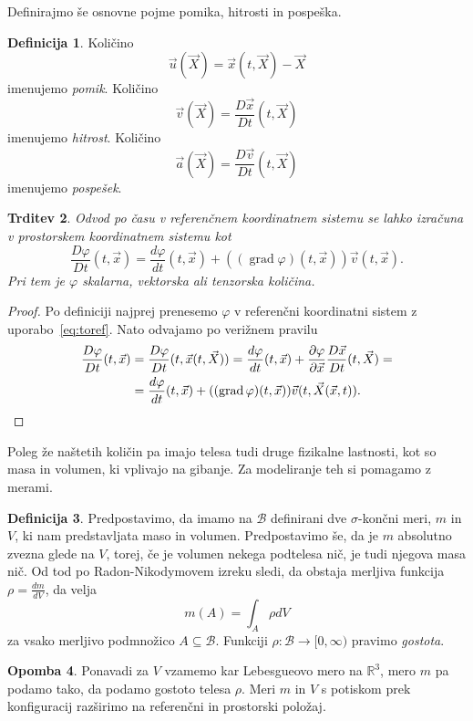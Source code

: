 \documentclass[12pt,a4paper,twoside]{article}
\theoremstyle{definition} %
\newtheorem{definicija}{Definicija}[section]
\newtheorem{opomba}[definicija]{Opomba}
\theoremstyle{plain} %
\newtheorem{trditev}[definicija]{Trditev}
\numberwithin{equation}{section}
\newcommand{\R}{\mathbb R}
\newcommand{\B}{\mathcal{B}}
\newcommand{\grad}{\operatorname{grad}}
\renewcommand{\phi}{\varphi}
\newcommand{\dpar}[2]{\ensuremath{\frac{\partial #1}{\partial #2}}}
\newcommand{\dd}[2]{\ensuremath{\frac{d #1}{d #2}}}
\newcommand{\ddt}[1]{\dd{#1}{t}}
\newcommand{\DD}[2]{\ensuremath{\frac{D #1}{D #2}}}
\newcommand{\DDt}[1]{\DD{#1}{t}}
\newcommand{\vv}{\vec{v}}
\newcommand{\vu}{\vec{u}}
\newcommand{\va}{\vec{a}}
\newcommand{\vX}{\vec{X}}
\newcommand{\vx}{\vec{x}}
\begin{document}
Definirajmo še osnovne pojme pomika, hitrosti in pospeška.
\begin{definicija}
  Količino \begin{equation} \vu(\vX) = \vx(t, \vX) - \vX \end{equation} imenujemo \emph{pomik}.
  Količino \begin{equation} \vv(\vX) = \DDt{\vx}(t, \vX) \end{equation} imenujemo \emph{hitrost}.
  Količino \begin{equation} \va(\vX) = \DDt{\vv}(t, \vX) \end{equation} imenujemo \emph{pospešek}.
\end{definicija}
\begin{trditev}
  Odvod po času v referenčnem koordinatnem sistemu se lahko izračuna v
  prostorskem koordinatnem sistemu kot
  \begin{equation}
    \DDt{\phi}(t, \vx) = \ddt{\phi}(t, \vx) + ((\grad \phi)(t, \vx)) \vv(t, \vx).
  \end{equation}
  Pri tem je $\phi$ skalarna, vektorska ali tenzorska količina.
\end{trditev}
\begin{proof}
  Po definiciji najprej prenesemo $\phi$ v referenčni koordinatni sistem z
  uporabo~\ref{eq:toref}. Nato odvajamo po verižnem pravilu
  \begin{align*}
    \DDt \phi(t, \vx) &= \DDt \phi(t, \vx(t, \vX)) =
    \ddt \phi(t, \vx) + \dpar{\phi}{\vx} \DDt{\vx} (t, \vX) = \\ \nonumber
    &= \ddt \phi(t, \vx) + ((\grad \phi)(t, \vx)) \vv(t, \vX(\vx, t)). \qedhere
  \end{align*}
\end{proof}

Poleg že naštetih količin pa imajo telesa tudi druge fizikalne lastnosti, kot so
masa in volumen, ki vplivajo na gibanje. Za modeliranje teh si pomagamo z
merami.

\begin{definicija}
  Predpostavimo, da imamo na $\B$ definirani dve $\sigma$-končni meri, $m$ in $V$, ki nam
  predstavljata maso in volumen. Predpostavimo še, da je $m$ absolutno zvezna glede na $V$, torej,
  če je volumen nekega podtelesa nič, je tudi njegova masa nič. Od tod po Radon-Nikodymovem izreku
  sledi, da obstaja merljiva funkcija $\rho =
  \dd{m}{V}$, da velja
  \begin{equation}
    m(A) = \int_{A} \rho dV
  \end{equation}
  za vsako merljivo podmnožico $A \subseteq \B$.
  Funkciji $\rho\colon\B\to[0, \infty)$ pravimo \emph{gostota}.
\end{definicija}
\begin{opomba}
  Ponavadi za $V$ vzamemo kar Lebesgueovo mero na $\R^3$, mero $m$ pa podamo tako, da
  podamo gostoto telesa $\rho$. Meri $m$ in $V$ s potiskom prek konfiguracij
  razširimo na referenčni in prostorski položaj.
\end{opomba}
\end{document}
